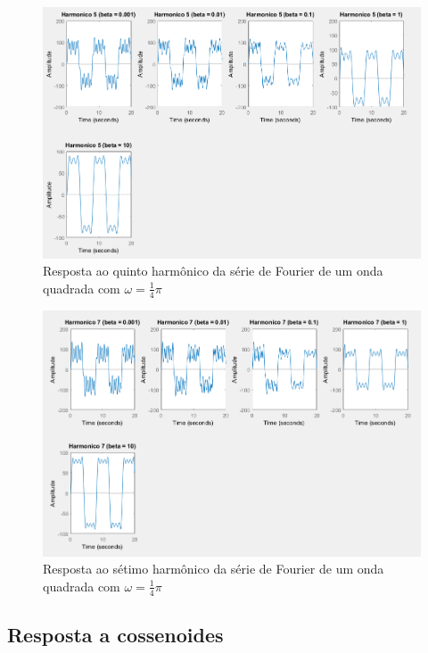 \documentclass[a4paper, 12pt]{article}
\begin{document}
			\begin{figure}[!ht]
				\centering
				\includegraphics[scale=0.48]{img/3i_beta.png}
				\caption{Resposta ao quinto harmônico da série de Fourier de um onda quadrada com $\omega = \frac{1}{4}\pi$}	
			\end{figure}		
			\begin{figure}[!ht]
				\centering
				\includegraphics[scale=0.5]{img/3j_beta.png}
				\caption{Resposta ao sétimo harmônico da série de Fourier de um onda quadrada com $\omega = \frac{1}{4}\pi$}	
			\end{figure}					
	
	\subsection{Resposta a cossenoides}	
\end{document}
